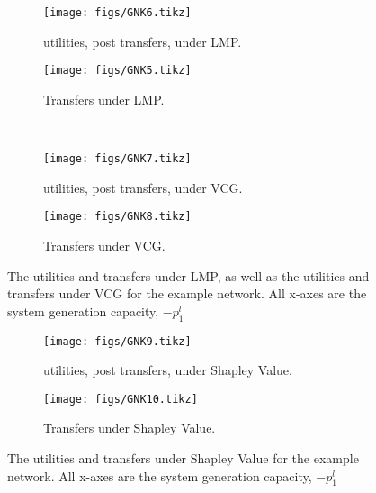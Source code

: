 \begin{figure}[]
	\begin{subfigure}{.48\linewidth}
		\texttt{[image: figs/GNK6.tikz]}%
		\caption{ utilities, post transfers, under LMP.}\label{fig:1e}
	\end{subfigure}
	\begin{subfigure}{.48\linewidth}
		\texttt{[image: figs/GNK5.tikz]}%
		\caption{ Transfers under LMP.}\label{fig:1f}
	\end{subfigure}
\vspace{5mm}\\
	\begin{subfigure}{.48\linewidth}
		\texttt{[image: figs/GNK7.tikz]}%
		\caption{ utilities, post transfers, under VCG.}\label{fig:1g}
	\end{subfigure}
	\begin{subfigure}{.48\linewidth}
		\texttt{[image: figs/GNK8.tikz]}%
		\caption{ Transfers under VCG.}\label{fig:1h}
	\end{subfigure}
	\vspace{0.3\baselineskip}
	\caption[Power-levels and utility imputations under LMP and VCG for example network]{The utilities and transfers under LMP, as well as the utilities and transfers under VCG for the example network. All x-axes are the system generation capacity, $-p_1^l$}\label{fig:11}
\end{figure}


\begin{figure}[]
	\begin{subfigure}{.48\linewidth}
		\texttt{[image: figs/GNK9.tikz]}%
		\caption{ utilities, post transfers, under Shapley Value.}\label{fig:1i}
	\end{subfigure}
	\begin{subfigure}{.48\linewidth}
		\texttt{[image: figs/GNK10.tikz]}%
		\caption{ Transfers under Shapley Value.}\label{fig:1j}
	\end{subfigure}
	\vspace{0.3\baselineskip}
	\caption[Power-levels and utility imputations under Shapley Value for example network]{The utilities and transfers under Shapley Value for the example network. All x-axes are the system generation capacity, $-p_1^l$}\label{fig:111}
\end{figure}

